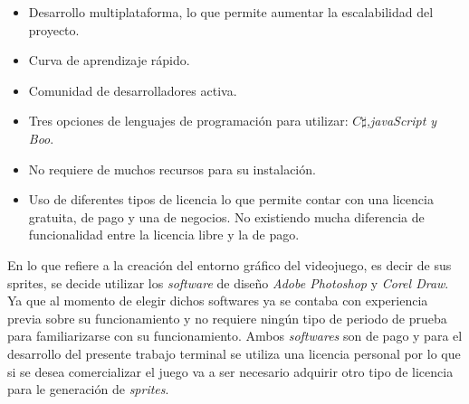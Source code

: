     \begin{itemize}
        \item Desarrollo multiplataforma, lo que permite aumentar la escalabilidad
        del proyecto.
        \item Curva de aprendizaje rápido.
        \item Comunidad de desarrolladores activa.
        \item Tres opciones de lenguajes de programación para utilizar:
        \textit{$C\sharp$,javaScript y Boo}.
        \item No requiere de muchos recursos para su instalación.
        \item Uso de diferentes tipos de licencia lo que permite contar con una
        licencia gratuita, de pago y una de negocios. No existiendo mucha diferencia
        de funcionalidad entre la licencia libre y la de pago.
    \end{itemize}
 En lo que refiere a la creación del entorno gráfico del videojuego, es decir de
 sus sprites, se decide utilizar los \textit{software} de diseño
 \textit{Adobe Photoshop} y \textit{Corel Draw}. Ya que al momento de elegir dichos
 softwares ya se contaba con experiencia previa sobre su funcionamiento y no
 requiere ningún tipo de periodo de prueba para familiarizarse con su funcionamiento.
 Ambos \textit{softwares} son de pago y para el desarrollo del presente trabajo
 terminal se utiliza una licencia personal por lo que si se desea comercializar
 el juego va a ser necesario adquirir otro tipo de licencia para le generación
 de \textit{sprites}.


